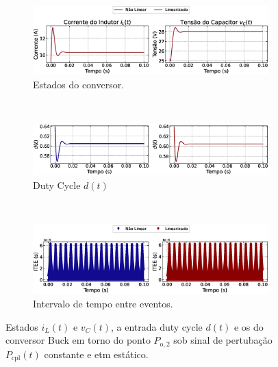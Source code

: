 \begin{figure}[H]
  \centering
  \captionsetup{justification=centering}
  \begin{subfigure}{1.\textwidth}
    \centering
    \includegraphics[width=1.\textwidth]{figuras/static-etm/buck/sim1/op2/result.eps}
    \caption{Estados do conversor.}
    \label{fig:buck_converter_constant_pcpl_static_etm_op2_duty_a}
  \end{subfigure}
  \\[6pt]
  \begin{subfigure}{1.\textwidth}
    \centering
    \includegraphics[width=1.\textwidth]{figuras/static-etm/buck/sim1/op2/duty-cycle.eps}
    \caption{Duty Cycle $d(t)$}
    \label{fig:buck_converter_constant_pcpl_static_etm_op2_duty_b}
  \end{subfigure}
  \\[6pt]
  \begin{subfigure}{1.\textwidth}
    \centering
    \includegraphics[width=1.\textwidth]{figuras/static-etm/buck/sim1/op2/inter-event-times.eps}
    \caption{Intervalo de tempo entre eventos.}
    \label{fig:buck_converter_constant_pcpl_static_etm_op2_duty_c}
  \end{subfigure}
  \caption{Estados $i_L(t)$ e $v_C(t)$, a entrada duty cycle $d(t)$ e os  do conversor Buck em torno do ponto $P_{\mathrm{o}, 2}$ sob sinal de pertubação $P_{\mathrm{cpl}}(t)$ constante e \acrshort{etm} estático.}
\end{figure}


